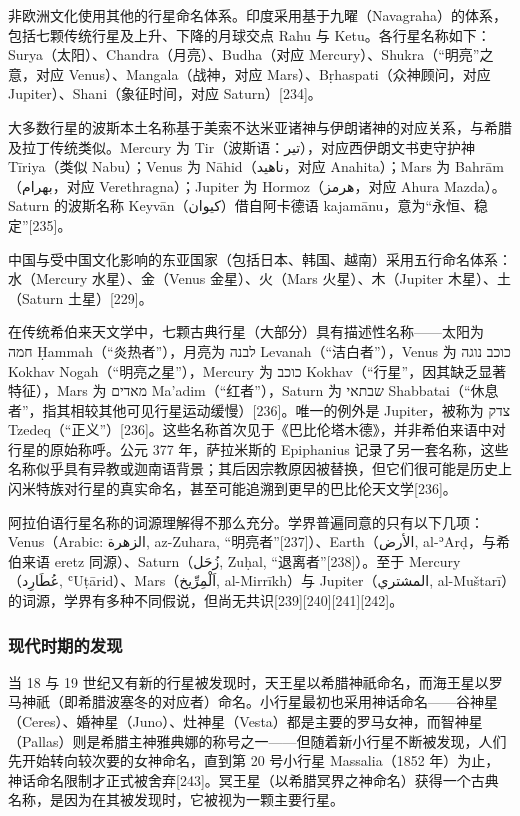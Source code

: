 非欧洲文化使用其他的行星命名体系。印度采用基于九曜（Navagraha）的体系，包括七颗传统行星及上升、下降的月球交点 Rahu 与 Ketu。各行星名称如下：Surya（太阳）、Chandra（月亮）、Budha（对应 Mercury）、Shukra（“明亮”之意，对应 Venus）、Mangala（战神，对应 Mars）、Bṛhaspati（众神顾问，对应 Jupiter）、Shani（象征时间，对应 Saturn）[234]。

大多数行星的波斯本土名称基于美索不达米亚诸神与伊朗诸神的对应关系，与希腊及拉丁传统类似。Mercury 为 Tir（波斯语：تیر），对应西伊朗文书吏守护神 Tīriya（类似 Nabu）；Venus 为 Nāhid（ناهید，对应 Anahita）；Mars 为 Bahrām（بهرام，对应 Verethragna）；Jupiter 为 Hormoz（هرمز，对应 Ahura Mazda）。Saturn 的波斯名称 Keyvān（کیوان）借自阿卡德语 kajamānu，意为“永恒、稳定”[235]。

中国与受中国文化影响的东亚国家（包括日本、韩国、越南）采用五行命名体系：水（Mercury 水星）、金（Venus 金星）、火（Mars 火星）、木（Jupiter 木星）、土（Saturn 土星）[229]。

在传统希伯来天文学中，七颗古典行星（大部分）具有描述性名称——太阳为 חמה Ḥammah（“炎热者”），月亮为 לבנה Levanah（“洁白者”），Venus 为 כוכב נוגה Kokhav Nogah（“明亮之星”），Mercury 为 כוכב Kokhav（“行星”，因其缺乏显著特征），Mars 为 מאדים Ma'adim（“红者”），Saturn 为 שבתאי Shabbatai（“休息者”，指其相较其他可见行星运动缓慢）[236]。唯一的例外是 Jupiter，被称为 צדק Tzedeq（“正义”）[236]。这些名称首次见于《巴比伦塔木德》，并非希伯来语中对行星的原始称呼。公元 377 年，萨拉米斯的 Epiphanius 记录了另一套名称，这些名称似乎具有异教或迦南语背景；其后因宗教原因被替换，但它们很可能是历史上闪米特族对行星的真实命名，甚至可能追溯到更早的巴比伦天文学[236]。

阿拉伯语行星名称的词源理解得不那么充分。学界普遍同意的只有以下几项：Venus（Arabic: الزهرة, az-Zuhara, “明亮者”[237]）、Earth（الأرض, al-ʾArḍ，与希伯来语 eretz 同源）、Saturn（زُحَل, Zuḥal, “退离者”[238]）。至于 Mercury（عُطَارِد, ʿUṭārid）、Mars（اَلْمِرِّيخ, al-Mirrīkh）与 Jupiter（المشتري, al-Muštarī）的词源，学界有多种不同假说，但尚无共识[239][240][241][242]。
\subsubsection{现代时期的发现}
当 18 与 19 世纪又有新的行星被发现时，天王星以希腊神祇命名，而海王星以罗马神祇（即希腊波塞冬的对应者）命名。小行星最初也采用神话命名——谷神星（Ceres）、婚神星（Juno）、灶神星（Vesta）都是主要的罗马女神，而智神星（Pallas）则是希腊主神雅典娜的称号之一——但随着新小行星不断被发现，人们先开始转向较次要的女神命名，直到第 20 号小行星 Massalia（1852 年）为止，神话命名限制才正式被舍弃[243]。冥王星（以希腊冥界之神命名）获得一个古典名称，是因为在其被发现时，它被视为一颗主要行星。

